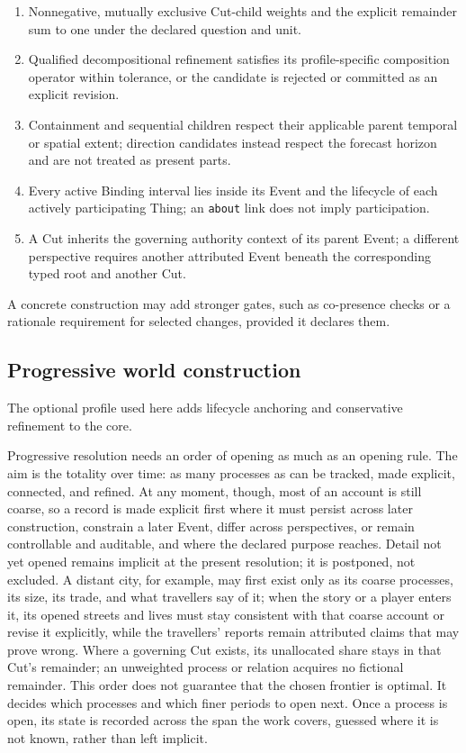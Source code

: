 \documentclass[11pt,a4paper]{article}
\begin{document}
\begin{enumerate}
  \item Nonnegative, mutually exclusive Cut-child weights and the explicit
    remainder sum to one under the declared question and unit.
  \item Qualified decompositional refinement satisfies its profile-specific
    composition operator within tolerance, or the candidate is rejected or
    committed as an explicit revision.
  \item Containment and sequential children respect their applicable parent
    temporal or spatial extent; direction candidates instead respect the
    forecast horizon and are not treated as present parts.
  \item Every active Binding interval lies inside its Event and the lifecycle
    of each actively participating Thing; an \texttt{about} link does not
    imply participation.
  \item A Cut inherits the governing authority context of its parent
    Event; a different perspective requires another attributed Event beneath
    the corresponding typed root and another Cut.
\end{enumerate}

A concrete construction may add stronger gates, such as co-presence checks or
a rationale requirement for selected changes, provided it declares them.

\subsection{Progressive world construction}
\label{sec:progressive-construction}

The optional profile used here adds lifecycle anchoring and conservative
refinement to the core.

Progressive resolution needs an order of opening as much as an opening rule.
The aim is the totality over time: as many processes as can be tracked, made
explicit, connected, and refined. At any moment, though, most of an account is
still coarse, so a record is made explicit first where it must persist across
later construction, constrain a later Event, differ across perspectives, or
remain controllable and auditable, and where the declared purpose reaches.
Detail not yet opened remains implicit at the present resolution; it is
postponed, not excluded. A distant city, for example, may first exist only as
its coarse processes, its size, its trade, and what travellers say of it; when
the story or a player enters it, its opened streets and lives must stay
consistent with that coarse account or revise it explicitly, while the
travellers' reports remain attributed claims that may prove wrong. Where a
governing Cut exists, its unallocated share
stays in that Cut's remainder; an unweighted process or relation acquires no
fictional remainder. This order does not guarantee that the chosen frontier is
optimal. It decides which processes and which finer periods to open next. Once
a process is open, its state is recorded across the span the work covers,
guessed where it is not known, rather than left implicit.
\end{document}
